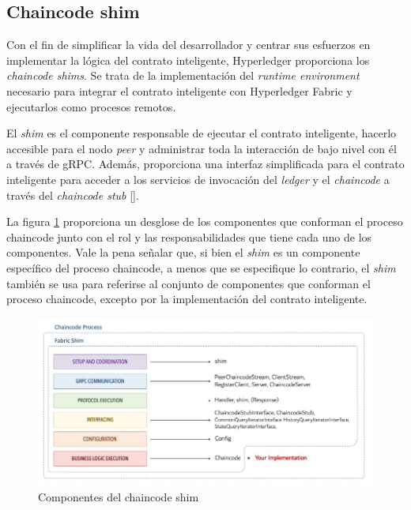 %



\subsection*{Chaincode shim}

Con el fin de simplificar la vida del desarrollador y centrar sus esfuerzos en implementar la lógica del contrato inteligente, Hyperledger proporciona los \textit{chaincode shims}. Se trata de la implementación del \textit{runtime environment} necesario para integrar el contrato inteligente con Hyperledger Fabric y ejecutarlos como procesos remotos.

El \textit{shim} es el componente responsable de ejecutar el contrato inteligente, hacerlo accesible para el nodo \textit{peer} y administrar toda la interacción de bajo nivel con él a través de gRPC. Además, proporciona una interfaz simplificada para el contrato inteligente para acceder a los servicios de invocación del \textit{ledger} y el \textit{chaincode} a través del \textit{chaincode stub} [\cite{hlf-internals}].

La figura \ref{fig:chaincodeshim} proporciona un desglose de los componentes que conforman el proceso chaincode junto con el rol y las responsabilidades que tiene cada uno de los componentes. Vale la pena señalar que, si bien el \textit{shim} es un componente específico del proceso chaincode, a menos que se especifique lo contrario, el \textit{shim} también se usa para referirse al conjunto de componentes que conforman el proceso chaincode, excepto por la implementación del contrato inteligente.

\begin{figure}[tbph]
\centering
\includegraphics[width=\textwidth]{Images/chaincode_shim}
\caption{Componentes del chaincode shim}
\label{fig:chaincodeshim}
\end{figure}


